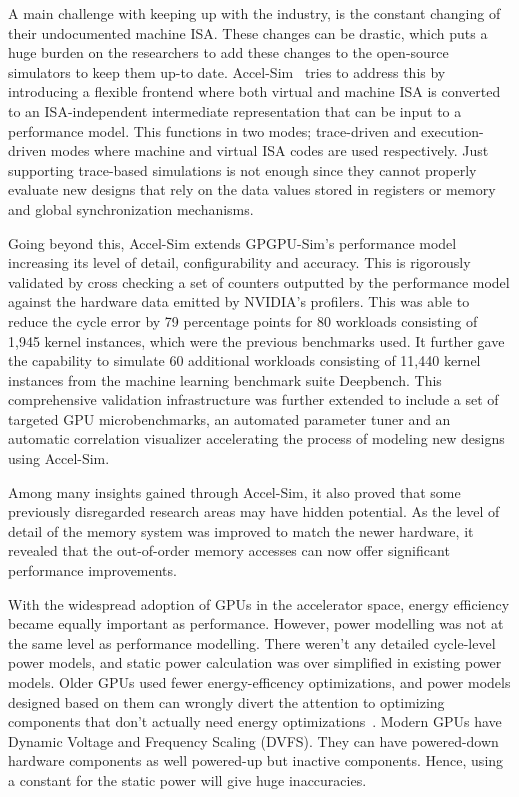 A main challenge with keeping up with the industry, is the constant changing of their undocumented machine ISA.
These changes can be drastic, which puts a huge burden on the researchers to add these changes to the open-source simulators to keep them up-to date.
Accel-Sim~\cite{Khairy2020} tries to address this by introducing a flexible frontend where both virtual and machine ISA is converted to an ISA-independent intermediate representation that can be input to a performance model.
This functions in two modes; trace-driven and execution-driven modes where machine and virtual ISA codes are used respectively.
Just supporting trace-based simulations is not enough since they cannot properly evaluate new designs that rely on the data values stored in registers or memory and global synchronization mechanisms.

Going beyond this, Accel-Sim extends GPGPU-Sim's performance model increasing its level of detail, configurability and accuracy.
This is rigorously validated by cross checking a set of counters outputted by the performance model against the hardware data emitted by NVIDIA's profilers.
This was able to reduce the cycle error by 79 percentage points for 80 workloads consisting of 1,945 kernel instances, which were the previous benchmarks used.
It further gave the capability to simulate 60 additional workloads consisting of 11,440 kernel instances from the machine learning benchmark suite Deepbench.
This comprehensive validation infrastructure was further extended to include a set of targeted GPU microbenchmarks, an automated parameter tuner and an automatic correlation visualizer accelerating the process of modeling new designs using Accel-Sim.

Among many insights gained through Accel-Sim, it also proved that some previously disregarded research areas may have hidden potential.
As the level of detail of the memory system was improved to match the newer hardware, it revealed that the out-of-order memory accesses can now offer significant performance improvements.

With the widespread adoption of GPUs in the accelerator space, energy efficiency became equally important as performance.
However, power modelling was not at the same level as performance modelling.
There weren't any detailed cycle-level power models, and static power calculation was over simplified in existing power models.
Older GPUs used fewer energy-efficency optimizations, and power models designed based on them can wrongly divert the attention to optimizing components that don't actually need energy optimizations~\cite{Kandiah2021}.
Modern GPUs have Dynamic Voltage and Frequency Scaling (DVFS).
They can have powered-down hardware components as well powered-up but inactive components.
Hence, using a constant for the static power will give huge inaccuracies.


